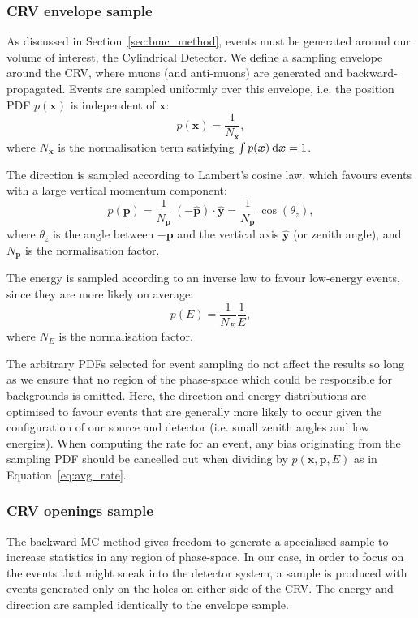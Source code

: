 \subsubsection{CRV envelope sample}
As discussed in Section~\ref{sec:bmc_method}, events must be generated around
our volume of interest, the Cylindrical Detector. We define a sampling
envelope around the CRV, where muons (and anti-muons) are generated and
backward-propagated. Events are sampled uniformly over this
envelope, i.e. the position PDF $p(\bm{x})$ is independent of $\bm{x}$:
\begin{equation}
p(\bm{x}) = \frac{1}{N_{\bm{x}}},
\end{equation}
where $N_{\bm{x}}$ is the normalisation term satisfying 
$\int p(\bm{x}) \: \textnormal{d}\bm{x} = 1$.

The direction is sampled according to Lambert's cosine law, which favours events
with a large vertical momentum component:
\begin{equation}
p(\bm{p}) = 
    \frac{1}{N_{\bm{p}}} \ (-\hat{\bm{p}}) \cdot \hat{\bm{y}} = 
    \frac{1}{N_{\bm{p}}}\:\cos(\theta_z),
\end{equation}
where $\theta_z$ is the angle between $-\bm{p}$ and the vertical axis $\hat{\bm{y}}$
(or zenith angle), and $N_{\bm{p}}$ is the normalisation factor. 

The energy is sampled according to an inverse law to
favour low-energy events, since they are more likely on average:
\begin{equation}
p(E) = \frac{1}{N_E}  \frac{1}{E},
\end{equation}
where $N_E$ is the normalisation factor. 

The arbitrary PDFs selected for event sampling do not affect the results so long
as we ensure that no region of the phase-space which could be responsible for
backgrounds is omitted. Here, the direction and energy distributions are
optimised to favour events that are generally more likely to
occur given the configuration of our source and detector (i.e. small zenith
angles and low energies). When computing the rate for an event, any bias
originating from the sampling PDF should be cancelled out when dividing by
$p(\bm{x}, \bm{p}, E)$ as in Equation~\ref{eq:avg_rate}.



\subsubsection{CRV openings sample}
The backward MC method gives freedom to generate a specialised sample to
increase statistics in any region of phase-space. In our case, in order to focus
on the events that might sneak into the detector system, a sample is produced
with events generated only on the holes on either side of the CRV. The energy
and direction are sampled identically to the envelope sample.

